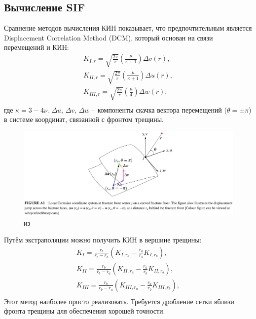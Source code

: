 \subsection{Вычисление SIF}
Сравнение методов вычисления КИН \cite{Gupta2017_SIF} показывает, что предпочтительным является Displacement Correlation Method (DCM), который основан на связи перемещений и КИН:
\begin{equation}
\begin{gathered}
K_{I,r}=\sqrt{\frac{2\pi}{r}}\left(\frac{\mu}{\kappa+1}\right)\Delta v\left(r\right), \\
K_{II,r}=\sqrt{\frac{2\pi}{r}}\left(\frac{\mu}{\kappa+1}\right)\Delta u\left(r\right), \\
K_{III,r}=\sqrt{\frac{2\pi}{r}}\left(\frac{\mu}{4}\right)\Delta w\left(r\right), \\
\end{gathered}
\label{F:DCM1}
\end{equation}
где $\kappa=3-4\nu$. $\Delta u,\,\Delta v,\,\Delta w$ -- компоненты скачка вектора перемещений ($\theta=\pm\pi$) в системе координат, связанной с фронтом трещины.
\begin{figure}[h!]
	\centering
	\includegraphics[height=0.2\textheight]{pictures/SIF.png}
	\caption{из \cite{Gupta2017}}
	\label{fig:SIF}
\end{figure}

Путём экстраполяции \cite{Dirgantara2002} можно получить КИН в вершине трещины:
\begin{equation}
\begin{gathered}
K_{I}=\frac{r_b}{r_b-r_a}\left(K_{I,r_a}-\frac{r_a}{r_b}K_{I,r_b}\right), \\
K_{II}=\frac{r_b}{r_b-r_a}\left(K_{II,r_a}-\frac{r_a}{r_b}K_{II,r_b}\right), \\
K_{III}=\frac{r_b}{r_b-r_a}\left(K_{III,r_a}-\frac{r_a}{r_b}K_{III,r_b}\right), \\
\end{gathered}
\label{F:DCM2}
\end{equation}
Этот метод наиболее просто реализовать. Требуется дробление сетки вблизи фронта трещины для обеспечения хорошей точности.
